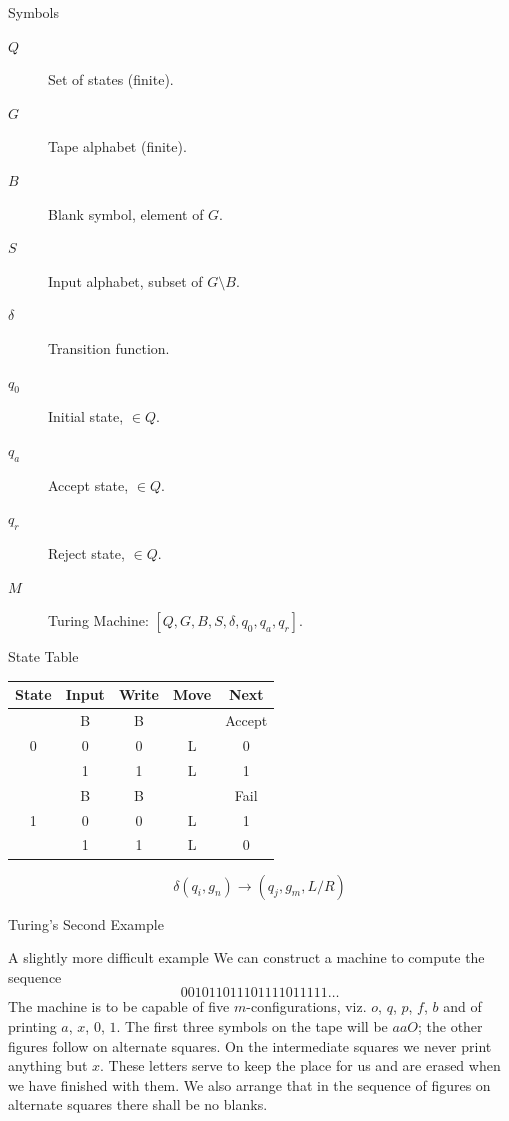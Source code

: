 \begin{frame}{Symbols}
\begin{description}
  \item[$Q$] Set of states (finite).
  \item[$G$] Tape alphabet (finite).
  \item[$B$] Blank symbol, element of $G$.
  \item[$S$] Input alphabet, subset of $G \setminus  B $.
  \item[$\delta$] Transition function.
  \item[$q_0$] Initial state, $\in Q$.
  \item[$q_a$] Accept state, $\in Q$.
  \item[$q_r$] Reject state, $\in Q$.
  \vspace{0.3cm}
  \item[$M$] Turing Machine: $[ Q, G, B, S, \delta , q_0, q_a, q_r ]$.
\end{description}
\end{frame}

\begin{frame}{State Table}
  \begin{table}
    \centering
    \begin{tabular}{cc|ccc}
      \toprule
      State  & Input  & Write & Move & Next \\
      \midrule
      \multirow{3}{*}{0} 
      & B & B &  & Accept \\
      & 0 & 0 & L & 0 \\
      & 1 & 1 & L & 1 \\
      \midrule
      \multirow{3}{*}{1}
      & B & B &  & Fail \\
      & 0 & 0 & L & 1 \\
      & 1 & 1 & L & 0 \\
      \bottomrule
    \end{tabular}
  \end{table}
  
  \[ \delta(q_i, g_n) \rightarrow (q_j, g_m, L/R) \]
\end{frame}

\begin{frame}{Turing's Second Example}
  \begin{block}{A slightly more difficult example}
    We can construct a machine to compute the sequence
    \[ 001011011101111011111 \ldots \]
    The machine is to be capable of five $m$-configurations, viz. $o$, $q$, $p$, $f$, $b$ and of printing $a$, $x$, $0$, $1$.
    The first three symbols on the tape will be $aaO$; the other figures follow on alternate squares.
    On the intermediate squares we never print anything but $x$.
    These letters serve to keep the place for us and are erased when we have finished with them.
    We also arrange that in the sequence of figures on alternate squares there shall be no blanks.
  \end{block}
\end{frame}

